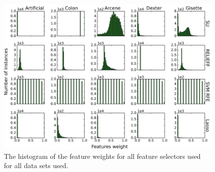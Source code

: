 \documentclass[twoside,11pt]{article}
\begin{document}
\begin{figure}[h!]
  \centering
    \includegraphics[width=\textwidth]{feature_weights_hist.png}
  \caption{The histogram of the feature weights for all feature selectors used for all data sets used.}
  \label{fig:feature_weights_hist}
\end{figure}

\end{document}
